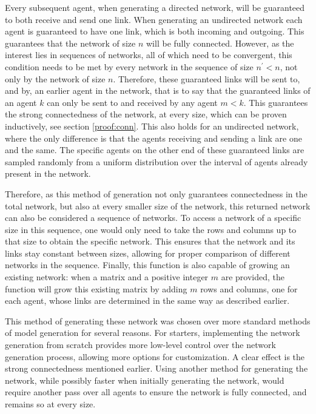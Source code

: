 \documentclass{article}
\begin{document}
Every subsequent agent, when generating a directed network, will be guaranteed to both receive and send one link. When generating an undirected network each agent is guaranteed to have one link, which is both incoming and outgoing. This guarantees that the network of size $n$ will be fully connected. However, as the interest lies in sequences of networks, all of which need to be convergent, this condition needs to be met by every network in the sequence of size $n^{\prime} < n$, not only by the network of size $n$. Therefore, these guaranteed links will be sent to, and by, an earlier agent in the network, that is to say that the guaranteed links of an agent $k$ can only be sent to and received by any agent $m < k$. This guarantees the strong connectedness of the network, at every size, which can be proven inductively, see section \ref{proof:conn}. This also holds for an undirected network, where the only difference is that the agents receiving and sending a link are one and the same. The specific agents on the other end of these guaranteed links are sampled randomly from a uniform distribution over the interval of agents already present in the network. \newline

Therefore, as this method of generation not only guarantees connectedness in the total network, but also at every smaller size of the network, this returned network can also be considered a sequence of networks. To access a network of a specific size in this sequence, one would only need to take the rows and columns up to that size to obtain the specific network. This ensures that the network and its links stay constant between sizes, allowing for proper comparison of different networks in the sequence. Finally, this function is also capable of growing an existing network: when a matrix and a positive integer $m$ are provided, the function will grow this existing matrix by adding $m$ rows and columns, one for each agent, whose links are determined in the same way as described earlier.\newline

This method of generating these network was chosen over more standard methods of model generation for several reasons. For starters, implementing the network generation from scratch provides more low-level control over the network generation process, allowing more options for customization. A clear effect is the strong connectedness mentioned earlier. Using another method for generating the network, while possibly faster when initially generating the network, would require another pass over all agents to ensure the network is fully connected, and remains so at every size. 
\end{document}
